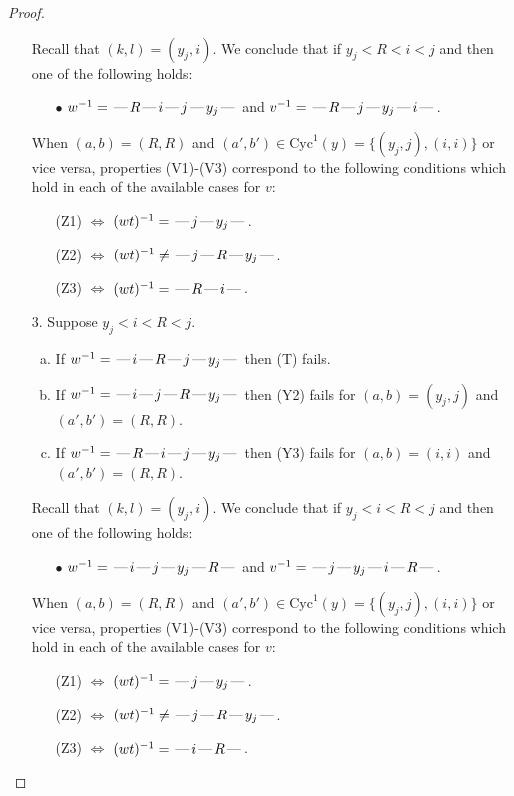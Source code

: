 \documentclass[10pt]{article}
\theoremstyle{definition}
\theoremstyle{definition}
\def\dash{\text{\hspace{0.5mm}---\hspace{0.5mm}}}
\def\Cyc{\mathrm{Cyc}}
\begin{document}
\begin{proof}
\begin{enumerate}
\begin{enumerate}[(a)]
\end{enumerate}
Recall that $(k,l) = (y_j,i)$.
We conclude that if $y_j < R < i < j$ and then one of the following holds:
\begin{enumerate}
\item[$\bullet$] $w^{-1} = \dash R\dash i\dash j\dash y_j\dash $ and $v^{-1} = \dash R\dash j\dash y_j\dash i\dash $.
\end{enumerate}
When $(a,b)= (R, R)$ and $(a',b')\in \Cyc^1(y)=\{(y_j,j),(i,i)\}$ or vice versa,
properties (V1)-(V3) correspond to the following conditions which hold in
each of the available cases for $v$:
\begin{enumerate}
\item[](Z1) $\Leftrightarrow$ $(wt)^{-1} = \dash j \dash y_j \dash$.
\item[](Z2) $\Leftrightarrow$ $(wt)^{-1} \neq \dash j \dash R \dash y_j \dash$.
\item[](Z3) $\Leftrightarrow$ $(wt)^{-1} = \dash R \dash i \dash$.
\end{enumerate}
\item[$3$.] Suppose $y_j < i < R < j$.
\begin{enumerate}[(a)]
\item If $w^{-1} = \dash i\dash R\dash j\dash y_j\dash $ then (T) fails.
\item If $w^{-1} = \dash i\dash j\dash R\dash y_j\dash $ then (Y2) fails for $(a,b)=(y_j,j)$ and $(a',b')=(R,R)$.
\item If $w^{-1} = \dash R\dash i\dash j\dash y_j\dash $ then (Y3) fails for $(a,b)=(i,i)$ and $(a',b')=(R,R)$.
\end{enumerate}
Recall that $(k,l) = (y_j,i)$.
We conclude that if $y_j < i < R < j$ and then one of the following holds:
\begin{enumerate}
\item[$\bullet$] $w^{-1} = \dash i\dash j\dash y_j\dash R\dash $ and $v^{-1} = \dash j\dash y_j\dash i\dash R\dash $.
\end{enumerate}
When $(a,b)= (R, R)$ and $(a',b')\in \Cyc^1(y)=\{(y_j,j),(i,i)\}$ or vice versa,
properties (V1)-(V3) correspond to the following conditions which hold in
each of the available cases for $v$:
\begin{enumerate}
\item[](Z1) $\Leftrightarrow$ $(wt)^{-1} = \dash j \dash y_j \dash$.
\item[](Z2) $\Leftrightarrow$ $(wt)^{-1} \neq \dash j \dash R \dash y_j \dash$.
\item[](Z3) $\Leftrightarrow$ $(wt)^{-1} = \dash i \dash R \dash$.

\end{enumerate}
\end{enumerate}
\end{proof}
\end{document}
